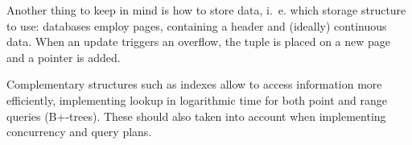 Another thing to keep in mind is how to store data, i.\ e. which storage structure to use: databases employ pages, containing a header and (ideally) continuous data. When an update triggers an overflow, the tuple is placed on a new page and a pointer is added. 

Complementary structures such as indexes allow to access information more efficiently, implementing lookup in logarithmic time for both point and range queries (B+-trees). These should also taken into account when implementing concurrency and query plans. 


